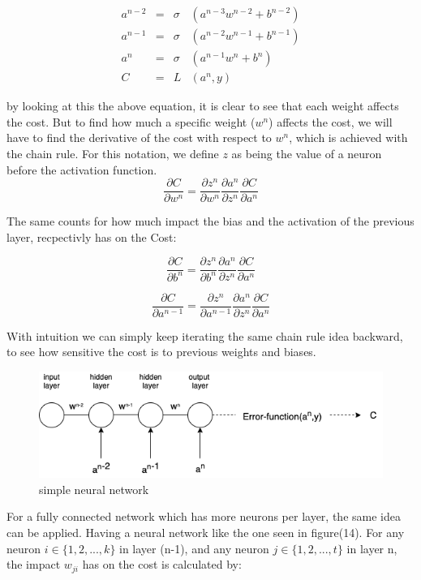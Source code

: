\begin{align}
    a^{n-2}& =& \sigma&(a^{n-3}w^{n-2} + b^{n-2}) \\
    a^{n-1}& =& \sigma&(a^{n-2}w^{n-1} + b^{n-1})\\
    a^n& =& \sigma&(a^{n-1}w^n + b^n)\\
    C& =& L&(a^n, y)
\end{align}

\noindent
by looking at this the above equation, it is clear to see that each weight affects the cost. But to find how much a specific weight ($w^n$) affects the cost, we will have to find the derivative of the cost with respect to $w^n$, which is achieved with the chain rule. For this notation, we define $z$ as being the value of a neuron before the activation function.\\

$$
\frac{\partial C}{\partial w^n} =\frac{\partial z^n}{\partial w^n}\frac{\partial a^n}{\partial z^n}\frac{\partial C}{  \partial a^n}
$$

The same counts for how much impact the bias and the activation of the previous layer, recpectivly has on the Cost:

$$
\frac{\partial C}{\partial b^n} =\frac{\partial z^n}{\partial b^n}\frac{\partial a^n}{\partial z^n}\frac{\partial C}{  \partial a^n}
$$

$$
\frac{\partial C}{\partial a^{n-1}} =\frac{\partial z^n}{\partial a^{n-1}}\frac{\partial a^n}{\partial z^n}\frac{\partial C}{  \partial a^n}
$$

\noindent
With intuition we can simply keep iterating the same chain rule idea backward, to see how sensitive the cost is to previous weights and biases. \\

\begin{figure}[!ht]
  \centering
  \includegraphics[scale=0.4]{latex/imgs/simplebackprop.png}
  \caption{simple neural network}\label{Baseline:before}
\end{figure}


\noindent
For a fully connected network which has more neurons per layer, the same idea can be applied. Having a neural network like the one seen in figure(14). For any neuron $i \in \{1,2,...,k\}$ in layer (n-1), and any neuron $j \in \{1,2,...,t\}$ in layer n, the impact $w_{ji}$ has on the cost is calculated by: \\

